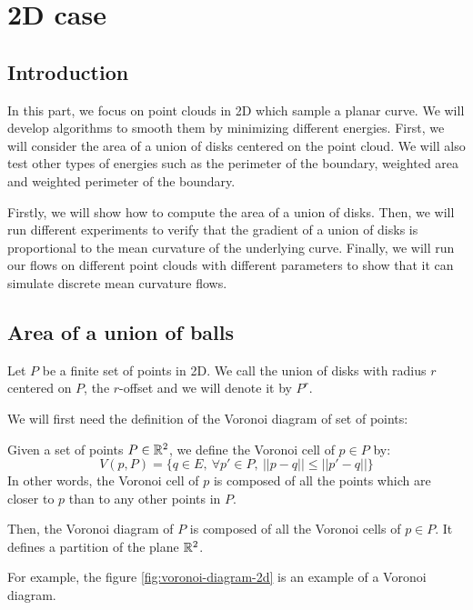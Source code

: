 \chapter{2D case}
\label{chapter:2d}

\section{Introduction}

In this part, we focus on point clouds in 2D which sample a planar curve.
We will develop algorithms to smooth them by minimizing different energies. First, we
will consider the area of a union of disks centered on the point cloud.  We will
also test other types of energies such as the perimeter of the boundary,
weighted area and weighted perimeter of the boundary.

Firstly, we will show how to compute the area of a union of disks.  Then, we
will run different experiments to verify that the gradient of a union of disks
is proportional to the mean curvature of the underlying curve. Finally, we will
run our flows on different point clouds with different parameters to show
that it can simulate discrete mean curvature flows.

\section{Area of a union of balls}

Let $ P $ be a finite set of points in 2D.  We call the union of disks with
radius $ r $ centered on $ P $, the $r$-offset and we will denote it by $ P^r $.

We will first need the definition of the Voronoi diagram of set of points:

\begin{definition}
    Given a set of points $ P \in \mathbb{R}^2 $, we define the Voronoi cell of $ p \in
    P $ by:
    $$ V(p, P) = \{ q \in E,~ \forall p' \in P,~|| p  - q || \leq || p' -
    q || \} $$
    In other words, the Voronoi cell of $ p $ is composed of all the points which are
    closer to $ p $ than to any other points in $ P $.

    Then, the Voronoi diagram of $ P $ is composed of all the Voronoi cells of $
    p \in P $. It defines a partition of the plane $ \mathbb{R}^2 $.
\end{definition}

For example, the figure \ref{fig:voronoi-diagram-2d} is an example of a Voronoi
diagram.

